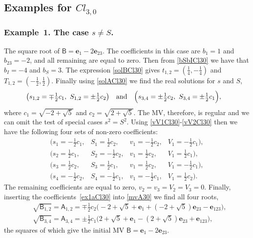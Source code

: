 \documentclass{birkjour}
\newcommand{\e}[1]{\mathbf{e}_{#1}} %
\newcommand{\cl}[2]{\ensuremath{\mathit{Cl}_{#1,#2}}}
\def\A{\mathsf{A}}
\def\B{\mathsf{B}}
\def\e#1{\mathbf{e}_{#1}} %
\begin{document}
\subsection{Examples for $\cl{3}{0}$}
\subsubsection*{Example~1. The case $s\ne S$.}\label{exmp1}
The square root of $\B=\e{1}-2 \e{23}$. The coefficients in this
case are $b_1=1$ and $b_{23}=-2$, and all remaining are equal to
zero. Then from \eqref {bSbICl30} we have that  $b_I=-4$ and
$b_S=3$. The expression \eqref{solBCl30} gives
$t_{1,2}=(\tfrac{1}{4},-\tfrac{1}{4})$ and
$T_{1,2}=(-\tfrac{1}{2},\tfrac{1}{2})$.  Finally using
\eqref{solACl30} we find the real solutions for $s$ and $S$,
\begin{equation}\begin{split}\label{ex1}
  &\bigl(s_{1,2}=\mp\tfrac{1}{2}c_1,\ S_{1,2}=\pm\tfrac{1}{2}c_2\bigr)\quad \text{and}\quad
  \Bigl(s_{3,4}=\pm\tfrac{1}{2}c_2,\ S_{3,4}=\pm\tfrac{1}{2}c_1\Bigr),
\end{split}\end{equation}
where $c_1=\sqrt{-2+\sqrt{5}}$ and  $c_2=\sqrt{2+\sqrt{5}}$. The
MV, therefore, is regular and we can omit the test of special
cases $s^2=S^2$. Using \eqref{vV1Cl30}-\eqref{vV2Cl30} then we
have the following four sets of non-zero coefficients:
\begin{equation}\label{ex1aCl30}\begin{array}{llll}
\bigl(s_1=-\tfrac{1}{2}c_1,& S_1=\tfrac{1}{2}c_2,& v_1=-\tfrac{1}{2}c_2,& V_1=-\tfrac{1}{2}c_1\bigr),\\
\bigl(s_2=\tfrac{1}{2}c_1,& S_2=-\tfrac{1}{2}c_2,& v_1=\tfrac{1}{2}c_2,& V_1=\tfrac{1}{2}c_1\bigr),\\
\bigl(s_3=\tfrac{1}{2}c_2,& S_3=\frac{1}{2}c_1,& v_1=\tfrac{1}{2}c_2,& V_1=-\tfrac{1}{2}c_1\bigr),\\
\bigl(s_4=-\tfrac{1}{2}c_2,& S_4=-\tfrac{1}{2}c_1,&
v_1=-\tfrac{1}{2}c_1,& V_1=\tfrac{1}{2}c_2\bigr).
\end{array}\end{equation}
The remaining coefficients are equal to zero, $v_2=v_3=V_2=V_3=0$.
Finally, inserting the coefficients~\eqref{ex1aCl30} into
\eqref{mvA30} we find all four roots,
\begin{equation}\begin{split}\label{ex1fa}
  &\sqrt{\B_{1,2}}=\A_{1,2} = \mp\frac12 c_2 \bigl(-2+\sqrt{5}+\e{1}+(-2+\sqrt{5}) \e{2 3}-\e{1 2 3}\bigr),\\
  &\sqrt{\B_{3,4}}=\A_{3,4}= \pm \frac12 c_1 \bigl(2+\sqrt{5}+\e{1}-(2+\sqrt{5}) \e{2 3}+\e{1 2
  3}\bigr),
\end{split}\end{equation}
the squares of which  give the initial MV $\B=\e{1}-2 \e{23}$.
\end{document}
